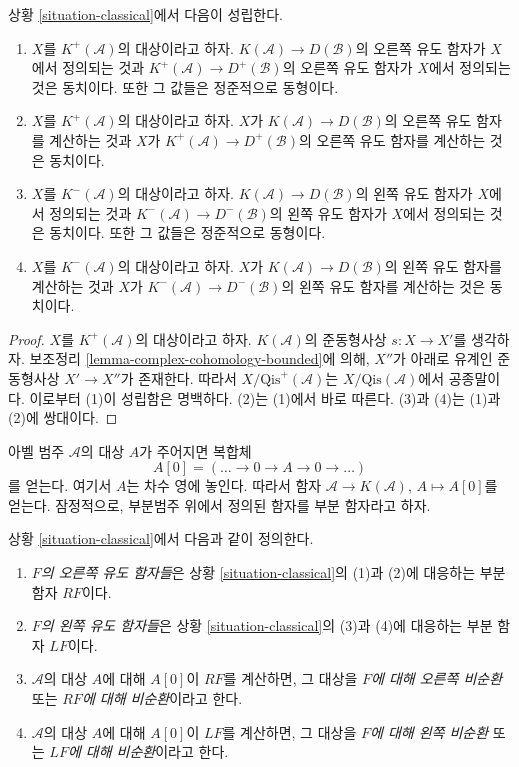 \begin{lemma}
\label{lemma-irrelevant}
상황 \ref{situation-classical}에서 다음이 성립한다.
\begin{enumerate}
\item $X$를 $K^{+}(\mathcal{A})$의 대상이라고 하자.
$K(\mathcal{A}) \to D(\mathcal{B})$의 오른쪽 유도 함자가 $X$에서
정의되는 것과 $K^{+}(\mathcal{A}) \to D^{+}(\mathcal{B})$의 오른쪽
유도 함자가 $X$에서 정의되는 것은 동치이다. 또한 그 값들은 정준적으로
동형이다.
\item $X$를 $K^{+}(\mathcal{A})$의 대상이라고 하자.
$X$가 $K(\mathcal{A}) \to D(\mathcal{B})$의 오른쪽 유도 함자를
계산하는 것과 $X$가 $K^{+}(\mathcal{A}) \to D^{+}(\mathcal{B})$의
오른쪽 유도 함자를 계산하는 것은 동치이다.
\item $X$를 $K^{-}(\mathcal{A})$의 대상이라고 하자.
$K(\mathcal{A}) \to D(\mathcal{B})$의 왼쪽 유도 함자가 $X$에서
정의되는 것과 $K^{-}(\mathcal{A}) \to D^{-}(\mathcal{B})$의 왼쪽
유도 함자가 $X$에서 정의되는 것은 동치이다. 또한 그 값들은 정준적으로
동형이다.
\item $X$를 $K^{-}(\mathcal{A})$의 대상이라고 하자.
$X$가 $K(\mathcal{A}) \to D(\mathcal{B})$의 왼쪽 유도 함자를 계산하는
것과 $X$가 $K^{-}(\mathcal{A}) \to D^{-}(\mathcal{B})$의 왼쪽 유도
함자를 계산하는 것은 동치이다.
\end{enumerate}
\end{lemma}

\begin{proof}
$X$를 $K^{+}(\mathcal{A})$의 대상이라고 하자.
$K(\mathcal{A})$의 준동형사상 $s : X \to X'$를 생각하자.
보조정리 \ref{lemma-complex-cohomology-bounded}에 의해, $X''$가 아래로
유계인 준동형사상 $X' \to X''$가 존재한다. 따라서
$X/\text{Qis}^+(\mathcal{A})$는 $X/\text{Qis}(\mathcal{A})$에서
공종말이다. 이로부터 (1)이 성립함은 명백하다. (2)는 (1)에서 바로
따른다. (3)과 (4)는 (1)과 (2)에 쌍대이다.
\end{proof}

\noindent
아벨 범주 $\mathcal{A}$의 대상 $A$가 주어지면 복합체
$$
A[0] = ( \ldots \to 0 \to A \to 0 \to \ldots )
$$
를 얻는다. 여기서 $A$는 차수 영에 놓인다. 따라서 함자
$\mathcal{A} \to K(\mathcal{A})$, $A \mapsto A[0]$를 얻는다.
잠정적으로, 부분범주 위에서 정의된 함자를 부분 함자라고 하자.

\begin{definition}
\label{definition-derived-functor}
상황 \ref{situation-classical}에서 다음과 같이 정의한다.
\begin{enumerate}
\item {\it $F$의 오른쪽 유도 함자들}은 상황
\ref{situation-classical}의 (1)과 (2)에 대응하는 부분 함자 $RF$이다.
\item {\it $F$의 왼쪽 유도 함자들}은 상황
\ref{situation-classical}의 (3)과 (4)에 대응하는 부분 함자 $LF$이다.
\item $\mathcal{A}$의 대상 $A$에 대해 $A[0]$이 $RF$를 계산하면,
그 대상을 {\it $F$에 대해 오른쪽 비순환} 또는 {\it $RF$에 대해 비순환}이라고
한다.
\item $\mathcal{A}$의 대상 $A$에 대해 $A[0]$이 $LF$를 계산하면,
그 대상을 {\it $F$에 대해 왼쪽 비순환} 또는 {\it $LF$에 대해 비순환}이라고
한다.
\end{enumerate}
\end{definition}

